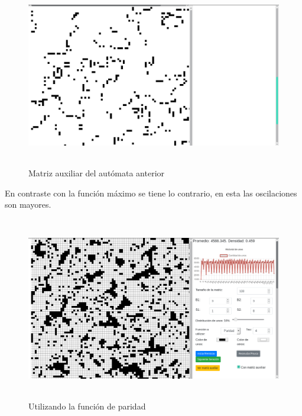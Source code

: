 \documentclass[12pt, titlepage]{article}
\begin{document}
\begin{figure}[H]
\begin{center}
 \includegraphics[width=15cm, height=8cm]{./img/3318-max-aux.png}
 \caption{Matriz auxiliar del autómata anterior}
 \label{fig:3318-max-aux}
\end{center}
\end{figure}
En contraste con la función máximo se tiene lo contrario, en esta las oscilaciones son mayores.
\begin{figure}[H]
\begin{center}
 \includegraphics[width=15cm, height=8cm]{./img/3318-paridad.png}
 \caption{Utilizando la función de paridad}
 \label{fig:3318-paridad}
\end{center}
\end{figure}
\end{document}
